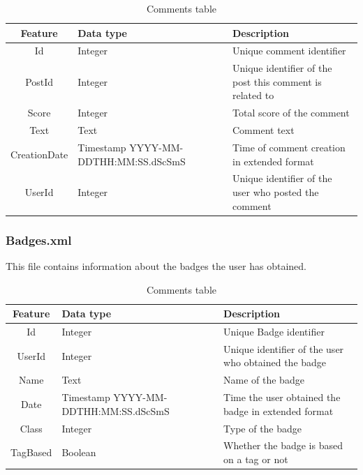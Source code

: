 \documentclass[11pt]{article} %
\begin{document}
      \begin{table}[!h]
        \centering
        \begin{tabular}{|c|p{}|p{}|}
          \hline

          Feature & Data type & Description \\ \hline
          Id & Integer & Unique comment identifier \\ \hline
          PostId & Integer & Unique identifier of the post this comment is related to \\ \hline
          Score & Integer & Total score of the comment \\ \hline
          Text & Text & Comment text \\ \hline
          CreationDate & Timestamp YYYY-MM-DDTHH:MM:SS.dScSmS & Time of comment creation in extended format \\ \hline
          UserId & Integer & Unique identifier of the user who posted the comment \\

          \hline
        \end{tabular}
        \caption{Comments table}
        \label{tab:comments}
      \end{table}

    \subsubsection{Badges.xml}

      This file contains information about the badges the user has obtained.

      \begin{table}[!h]
        \centering
        \begin{tabular}{|c|p{}|p{}|}
          \hline

          Feature & Data type & Description \\ \hline
          Id & Integer & Unique Badge identifier \\ \hline
          UserId & Integer & Unique identifier of the user who obtained the badge \\ \hline
          Name & Text & Name of the badge \\ \hline
          Date & Timestamp YYYY-MM-DDTHH:MM:SS.dScSmS & Time the user obtained the badge in extended format \\ \hline
          Class & Integer & Type of the badge \\ \hline
          TagBased & Boolean & Whether the badge is based on a tag or not \\

          \hline
        \end{tabular}
        \caption{Comments table}
        \label{tab:badges}
      \end{table}
\end{document}
